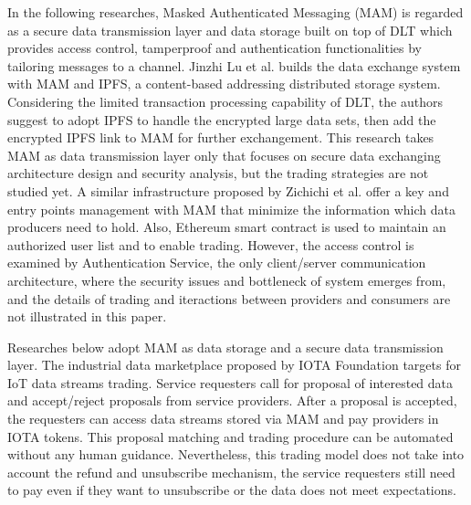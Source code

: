 \documentclass[conference]{IEEEtran}
\begin{document}
In the following researches, Masked Authenticated Messaging (MAM)\cite{MAM} is regarded as a secure data transmission layer and data storage built on top of DLT which provides access control, tamperproof and authentication functionalities by tailoring messages to a channel. Jinzhi Lu et al.\cite{luDecentralizedDM} builds the data exchange system with MAM and IPFS\cite{IPFS}, a content-based addressing distributed storage system. Considering the limited transaction processing capability of DLT, the authors suggest to adopt IPFS to handle the encrypted large data sets, then add the encrypted IPFS link to MAM for further exchangement. This research takes MAM as data transmission layer only that focuses on secure data exchanging architecture design and security analysis, but the trading strategies are not studied yet. A similar infrastructure proposed by Zichichi et al.\cite{SocialGood} offer a key and entry points management with MAM that minimize the information which data producers need to hold. Also, Ethereum smart contract is used to maintain an authorized user list and to enable trading. However, the access control is examined by Authentication Service, the only client/server communication architecture, where the security issues and bottleneck of system emerges from, and the details of trading and iteractions between providers and consumers are not illustrated in this paper.

Researches below adopt MAM as data storage and a secure data transmission layer. The industrial data marketplace\cite{IOTAIdustryMarketplace} proposed by IOTA Foundation targets for IoT data streams trading. Service requesters call for proposal of interested data and accept/reject proposals from service providers. After a proposal is accepted, the requesters can access data streams stored via MAM and pay providers in IOTA tokens. This proposal matching and trading procedure can be automated without any human guidance\cite{IOTAIdustryMarketplaceWithoutHuman}. Nevertheless, this trading model does not take into account the refund and unsubscribe mechanism, the service requesters still need to pay even if they want to unsubscribe or the data does not meet expectations.
\end{document}

